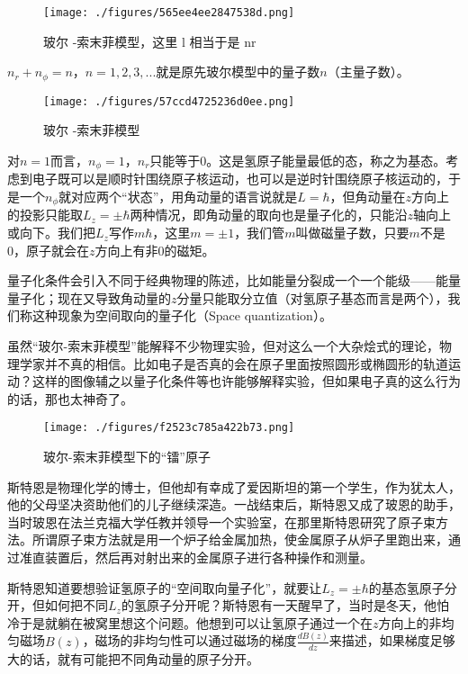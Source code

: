 \begin{figure}[ht]
\centering
\texttt{[image: ./figures/565ee4ee2847538d.png]}
\caption{玻尔 -索末菲模型，这里 l 相当于是 nr} \label{fig_QMPre2_15}
\end{figure}

$n_r + n_\phi = n $，$n = 1, 2, 3, ...$就是原先玻尔模型中的量子数$n$（主量子数）。

\begin{figure}[ht]
\centering
\texttt{[image: ./figures/57ccd4725236d0ee.png]}
\caption{ 玻尔 -索末菲模型} \label{fig_QMPre2_16}
\end{figure}

对$n = 1$而言，$n_\phi = 1$，$n_r$只能等于0。这是氢原子能量最低的态，称之为基态。考虑到电子既可以是顺时针围绕原子核运动，也可以是逆时针围绕原子核运动的，于是一个$n_\phi$就对应两个“状态”，用角动量的语言说就是$L = \hbar$，但角动量在$z$方向上的投影只能取$L_z = \pm \hbar $两种情况，即角动量的取向也是量子化的，只能沿$z$轴向上或向下。我们把$L_z$写作$m \hbar$，这里$m = \pm 1$，我们管$m$叫做磁量子数，只要$m$不是0，原子就会在$z$方向上有非0的磁矩。


量子化条件会引入不同于经典物理的陈述，比如能量分裂成一个一个能级——能量量子化；现在又导致角动量的$z$分量只能取分立值（对氢原子基态而言是两个），我们称这种现象为空间取向的量子化（Space quantization）。


虽然“玻尔-索末菲模型”能解释不少物理实验，但对这么一个大杂烩式的理论，物理学家并不真的相信。比如电子是否真的会在原子里面按照圆形或椭圆形的轨道运动？这样的图像辅之以量子化条件等也许能够解释实验，但如果电子真的这么行为的话，那也太神奇了。

\begin{figure}[ht]
\centering
\texttt{[image: ./figures/f2523c785a422b73.png]}
\caption{玻尔-索末菲模型下的“镭”原子} \label{fig_QMPre2_17}
\end{figure}

斯特恩是物理化学的博士，但他却有幸成了爱因斯坦的第一个学生，作为犹太人，他的父母坚决资助他们的儿子继续深造。一战结束后，斯特恩又成了玻恩的助手，当时玻恩在法兰克福大学任教并领导一个实验室，在那里斯特恩研究了原子束方法。所谓原子束方法就是用一个炉子给金属加热，使金属原子从炉子里跑出来，通过准直装置后，然后再对射出来的金属原子进行各种操作和测量。

斯特恩知道要想验证氢原子的“空间取向量子化”，就要让$L_z = \pm \hbar$的基态氢原子分开，但如何把不同$L_z$的氢原子分开呢？斯特恩有一天醒早了，当时是冬天，他怕冷于是就躺在被窝里想这个问题。他想到可以让氢原子通过一个在$z$方向上的非均匀磁场$B(z)$，磁场的非均匀性可以通过磁场的梯度$\frac{d B(z)}{d z}$来描述，如果梯度足够大的话，就有可能把不同角动量的原子分开。

